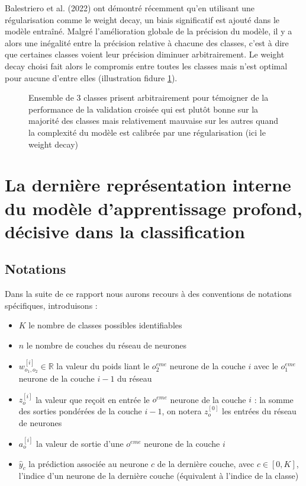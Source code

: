 \documentclass[12pt,english, openany]{book}
\begin{document}
Balestriero et al. (2022) \cite{NEURIPS2022_f73c0453} ont démontré récemment qu'en utilisant une régularisation comme le weight decay, un biais significatif est ajouté dans le modèle entraîné. Malgré l'amélioration globale de la précision du modèle, il y a alors une inégalité entre la précision relative à chacune des classes, c'est à dire que certaines classes voient leur précision diminuer arbitrairement. Le weight decay choisi fait alors le compromis entre toutes les classes mais n'est optimal pour aucune d'entre elles (illustration fidure \ref{fig:class_inequalities}).
\begin{figure}[ht]
  \centering
  
  \caption{Ensemble de 3 classes prisent arbitrairement pour témoigner de la performance de la validation croisée qui est plutôt bonne sur la majorité des classes mais relativement mauvaise sur les autres quand la complexité du modèle est calibrée par une régularisation (ici le weight decay) }
  \label{fig:class_inequalities}
\end{figure}


\chapter{La dernière représentation interne du modèle d'apprentissage profond, décisive dans la classification }
\section{Notations}
\label{sec:Nota1}
Dans la suite de ce rapport nous aurons recours à des conventions de notations spécifiques, introduisons : \\

\begin{itemize}
    \item $K$ le nombre de classes possibles identifiables\\
    \item $n$ le nombre de couches du  réseau de neurones\\
    \item $w^{[i]}_{o_1,o_2} \in \mathbb{R}$ la valeur du poids liant le $o_2^{eme}$ neurone de la couche $i$ avec le $o_1^{eme}$ neurone de la couche $i-1$ du réseau\\
    \item $z_o^{[i]}$ la valeur que reçoit en entrée le $o^{eme}$ neurone de la couche $i$ : la somme des sorties pondérées de la couche $i-1$, on notera $z^{[0]}_o$ les entrées du réseau de neurones\\
    \item $a_o^{[i]}$ la valeur de sortie d'une $o^{eme}$ neurone de la couche $i$ \\
    \item $\hat{y}_c$ la prédiction associée au neurone $c$ de la dernière couche, avec $c \in [0, K]$, l'indice d'un neurone de la dernière couche (équivalent à l'indice de la classe) \\
    
\end{itemize}
\end{document}
